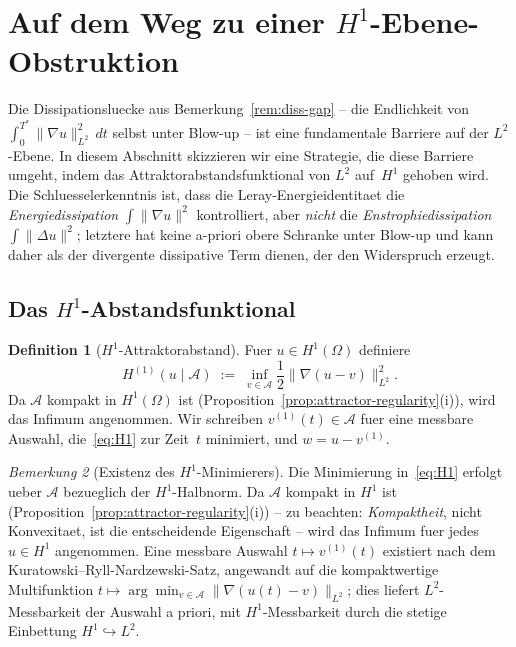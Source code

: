 \documentclass[12pt,a4paper]{article}
\theoremstyle{definition}
\newtheorem{definition}{Definition}[section]
\theoremstyle{plain}
\theoremstyle{remark}
\newtheorem{remark}[definition]{Bemerkung}
\begin{document}
\section{Auf dem Weg zu einer $H^1$-Ebene-Obstruktion}\label{sec:H1-lift}

Die Dissipationsluecke aus Bemerkung~\ref{rem:diss-gap} -- die
Endlichkeit von $\int_0^{T^*}\|\nabla u\|_{L^2}^2\,dt$ selbst unter
Blow-up -- ist eine fundamentale Barriere auf der $L^2$-Ebene. In diesem
Abschnitt skizzieren wir eine Strategie, die diese Barriere umgeht, indem
das Attraktorabstandsfunktional von $L^2$ auf~$H^1$ gehoben wird.
Die Schluesselerkenntnis ist, dass die Leray-Energieidentitaet die
\emph{Energiedissipation} $\int\|\nabla u\|^2$ kontrolliert, aber \emph{nicht} die
\emph{Enstrophiedissipation} $\int\|\Delta u\|^2$; letztere hat
keine a-priori obere Schranke unter Blow-up und kann daher als der
divergente dissipative Term dienen, der den Widerspruch erzeugt.

\subsection{Das $H^1$-Abstandsfunktional}

\begin{definition}[$H^1$-Attraktorabstand]\label{def:H1}
Fuer $u \in H^1(\Omega)$ definiere
\begin{equation}\label{eq:H1}
  H^{(1)}\!(u \mid \mathcal{A})
  \;:=\;
  \inf_{v \in \mathcal{A}}
  \frac{1}{2}\|\nabla(u - v)\|_{L^2}^2.
\end{equation}
Da $\mathcal{A}$ kompakt in $H^1(\Omega)$ ist
(Proposition~\ref{prop:attractor-regularity}(i)), wird das Infimum
angenommen. Wir schreiben $v^{(1)}(t) \in \mathcal{A}$ fuer eine
messbare Auswahl, die~\eqref{eq:H1} zur Zeit~$t$ minimiert,
und $w = u - v^{(1)}$.
\end{definition}

\begin{remark}[Existenz des $H^1$-Minimierers]
Die Minimierung in~\eqref{eq:H1} erfolgt ueber $\mathcal{A}$ bezueglich
der $H^1$-Halbnorm. Da $\mathcal{A}$ kompakt
in $H^1$ ist (Proposition~\ref{prop:attractor-regularity}(i)) -- zu beachten:
\emph{Kompaktheit}, nicht Konvexitaet, ist die entscheidende
Eigenschaft -- wird das Infimum fuer jedes $u \in H^1$ angenommen.
Eine messbare Auswahl $t \mapsto v^{(1)}(t)$ existiert nach dem
Kuratowski--Ryll-Nardzewski-Satz, angewandt auf die kompaktwertige
Multifunktion $t \mapsto \arg\min_{v \in \mathcal{A}}
\|\nabla(u(t)-v)\|_{L^2}$; dies liefert $L^2$-Messbarkeit
der Auswahl a priori, mit $H^1$-Messbarkeit durch die
stetige Einbettung $H^1 \hookrightarrow L^2$.
\end{remark}
\end{document}
